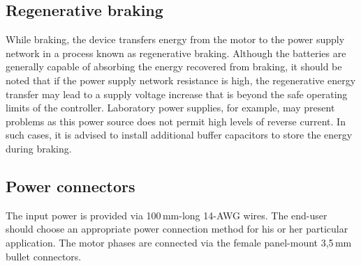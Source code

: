 \subsection{Regenerative braking}
While braking, the device transfers energy from the motor to the power supply network in a process known
as regenerative braking. Although the batteries are generally capable of absorbing the energy recovered
from braking, it should be noted that if the power supply network resistance is high, the regenerative
energy transfer may lead to a supply voltage increase that is beyond the safe operating limits of the
controller. Laboratory power supplies, for example, may present problems as this power source does not
permit high levels of reverse current. In such cases, it is advised to install additional buffer capacitors
to store the energy during braking.

\subsection{Power connectors}
The input power is provided via 100\,mm-long 14-AWG wires. The end-user should choose an appropriate power
connection method for his or her particular application.
The motor phases are connected via the female panel-mount 3,5\,mm bullet connectors. 

\newpage

